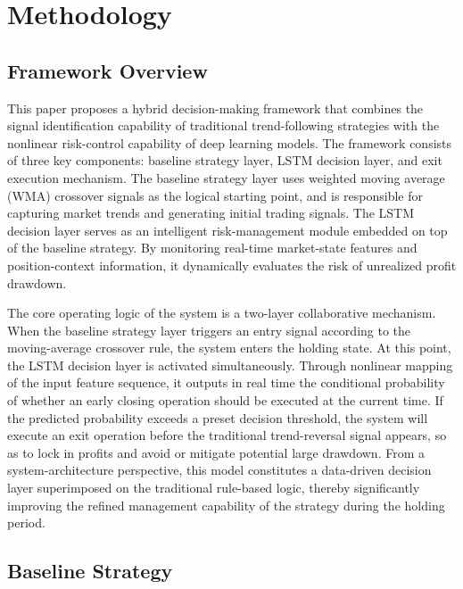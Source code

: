 \documentclass[12pt]{article}
\begin{document}
\section{Methodology}
\label{sec:methodology}

\subsection{Framework Overview}

This paper proposes a hybrid decision-making framework that combines the signal identification 
capability of traditional trend-following strategies with the nonlinear risk-control capability 
of deep learning models. The framework consists of three key components: baseline strategy 
layer, LSTM decision layer, and exit execution mechanism. The baseline strategy layer uses 
weighted moving average (WMA) crossover signals as the logical starting point, and is 
responsible for capturing market trends and generating initial trading signals. The LSTM 
decision layer serves as an intelligent risk-management module embedded on top of the baseline 
strategy. By monitoring real-time market-state features and position-context information, it 
dynamically evaluates the risk of unrealized profit drawdown.

The core operating logic of the system is a two-layer collaborative mechanism. When the 
baseline strategy layer triggers an entry signal according to the moving-average crossover rule, 
the system enters the holding state. At this point, the LSTM decision layer is activated 
simultaneously. Through nonlinear mapping of the input feature sequence, it outputs in real 
time the conditional probability of whether an early closing operation should be executed at 
the current time. If the predicted probability exceeds a preset decision threshold, the system 
will execute an exit operation before the traditional trend-reversal signal appears, so as to 
lock in profits and avoid or mitigate potential large drawdown. From a system-architecture 
perspective, this model constitutes a data-driven decision layer superimposed on the 
traditional rule-based logic, thereby significantly improving the refined management capability 
of the strategy during the holding period.

\subsection{Baseline Strategy}
\end{document}

